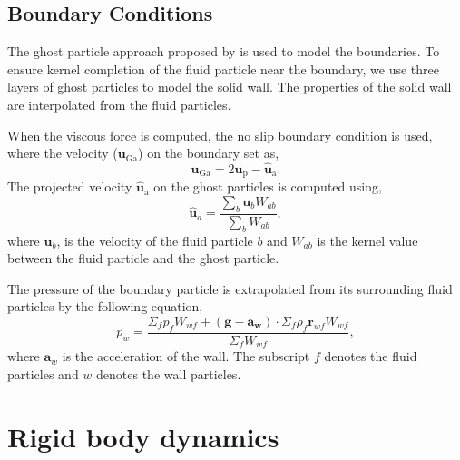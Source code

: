 \documentclass[preprint,12pt]{elsarticle}
\newcommand{\ten}[1]{\ensuremath{\mathbf{#1}}}
\begin{document}
\FloatBarrier%
\subsection{Boundary Conditions}
\label{sec:boundary_conditions}

The ghost particle approach proposed by \citet{Adami2012} is used to model the
boundaries. To ensure kernel completion of the fluid particle near the
boundary, we use three layers of ghost particles to model the solid wall.  The
properties of the solid wall are interpolated from the fluid particles.

When the viscous force is computed, the no slip boundary condition is used,
where the velocity ($\ten{u}_{\text{Ga}}$) on the boundary set as,
\begin{equation}
  \label{eq:no-slip-bc-u}
  \ten{u}_{\text{Ga}} = 2 \ten{u}_{\text{p}} - \ten{\hat{u}}_{\text{a}}.
\end{equation}
The projected velocity $\ten{\hat{u}}_{\text{a}}$ on the ghost particles is
computed using,
\begin{equation}
  \label{eq:v-ghost}
  \ten{\hat{u}}_a = \frac{\sum_b\ten{u}_b W_{ab}}{\sum_b W_{ab}},
\end{equation}
where $\ten{u}_b$, is the velocity of the fluid particle $b$ and $W_{ab}$ is the kernel
value between the fluid particle and the ghost particle.


The pressure of the boundary particle is extrapolated from its surrounding
fluid particles by the following equation,
\begin{equation}
  \label{eq:pressure-bc}
  p_w = \frac{\Sigma_f p_f W_{wf} + (\ten{g} - \ten{a}_{\ten{w}}) \cdot \Sigma_f
    \rho_f \ten{r}_{wf} W_{wf}}{\Sigma_f W_{wf}},
\end{equation}
where $\ten{a}_w$ is the acceleration of the wall. The subscript $f$ denotes
the fluid particles and $w$ denotes the wall particles.



\FloatBarrier%
\section{Rigid body dynamics}
\label{sec:rbd}

\end{document}
